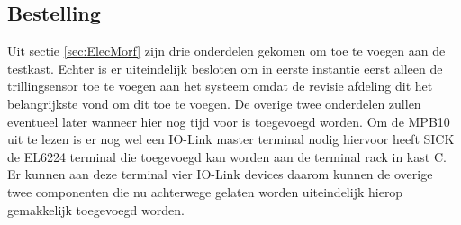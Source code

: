 \subsection{Bestelling}

Uit sectie \ref{sec:ElecMorf} zijn drie onderdelen gekomen om toe te voegen aan de testkast. Echter is er uiteindelijk besloten om in eerste instantie eerst alleen de trillingsensor toe te voegen aan het systeem omdat de revisie afdeling dit het belangrijkste vond om dit toe te voegen. De overige twee onderdelen zullen eventueel later wanneer hier nog tijd voor is toegevoegd worden. Om de MPB10 uit te lezen is er nog wel een IO-Link master terminal nodig hiervoor heeft SICK de EL6224 terminal die toegevoegd kan worden aan de terminal rack in kast C. Er kunnen aan deze terminal vier IO-Link devices daarom kunnen de overige twee componenten die nu achterwege gelaten worden uiteindelijk hierop gemakkelijk toegevoegd worden.